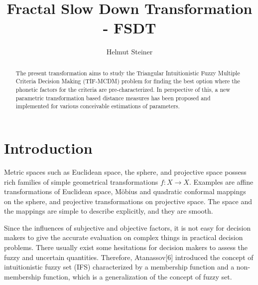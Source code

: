 \documentclass[a4paper]{article}
\title{Fractal Slow Down Transformation - FSDT}
\author{Helmut Steiner}
\begin{document}
\maketitle

\begin{abstract}
The present transformation aims to study the Triangular Intuitionistic Fuzzy Multiple Criteria Decision Making (TIF-MCDM)
problem for finding the best option where the phonetic factors for the criteria are pre-characterized. In perspective of this, a new
parametric transformation based distance measures has been proposed and implemented for various conceivable estimations of parameters. 
\end{abstract}

\section{Introduction}

Metric spaces such as Euclidean space, the sphere, and projective space possess rich families of simple geometrical transformations $f:X→X$. Examples are affine transformations of Euclidean space, Möbius and quadratic conformal mappings on the sphere, and projective transformations on projective space. The space and the mappings are simple to describe explicitly, and they are smooth.

Since the influences of subjective and objective factors, it is not easy for decision makers to 
give the accurate evaluation on complex things in practical decision problems. There
usually exist some hesitations for decision makers to assess the fuzzy and uncertain 
quantities. Therefore, Atanassov[6] introduced the concept of intuitionistic fuzzy set (IFS) 
characterized by a membership function and a non-membership function, which is a 
generalization of the concept of fuzzy set.
\end{document}
